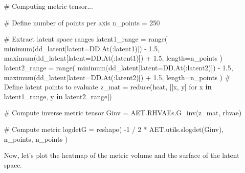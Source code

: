 \documentclass[
]{scrartcl}
\newenvironment{Shaded}{\begin{snugshade}}{\end{snugshade}}
\newcommand{\CommentTok}[1]{\textcolor[rgb]{0.37,0.37,0.37}{#1}}
\newcommand{\FloatTok}[1]{\textcolor[rgb]{0.68,0.00,0.00}{#1}}
\newcommand{\FunctionTok}[1]{\textcolor[rgb]{0.28,0.35,0.67}{#1}}
\newcommand{\KeywordTok}[1]{\textcolor[rgb]{0.00,0.23,0.31}{\textbf{#1}}}
\newcommand{\NormalTok}[1]{\textcolor[rgb]{0.00,0.23,0.31}{#1}}
\newcommand{\OperatorTok}[1]{\textcolor[rgb]{0.37,0.37,0.37}{#1}}
\begin{document}
\begin{Shaded}
\begin{Highlighting}[]
\CommentTok{\# Computing metric tensor...}

\CommentTok{\# Define number of points per axis}
\NormalTok{n\_points }\OperatorTok{=} \FloatTok{250}

\CommentTok{\# Extract latent space ranges}
\NormalTok{latent1\_range }\OperatorTok{=} \FunctionTok{range}\NormalTok{(}
    \FunctionTok{minimum}\NormalTok{(dd\_latent[latent}\OperatorTok{=}\NormalTok{DD.}\FunctionTok{At}\NormalTok{(}\OperatorTok{:}\NormalTok{latent1)]) }\OperatorTok{{-}} \FloatTok{1.5}\NormalTok{,}
    \FunctionTok{maximum}\NormalTok{(dd\_latent[latent}\OperatorTok{=}\NormalTok{DD.}\FunctionTok{At}\NormalTok{(}\OperatorTok{:}\NormalTok{latent1)]) }\OperatorTok{+} \FloatTok{1.5}\NormalTok{,}
\NormalTok{    length}\OperatorTok{=}\NormalTok{n\_points}
\NormalTok{)}
\NormalTok{latent2\_range }\OperatorTok{=} \FunctionTok{range}\NormalTok{(}
    \FunctionTok{minimum}\NormalTok{(dd\_latent[latent}\OperatorTok{=}\NormalTok{DD.}\FunctionTok{At}\NormalTok{(}\OperatorTok{:}\NormalTok{latent2)]) }\OperatorTok{{-}} \FloatTok{1.5}\NormalTok{,}
    \FunctionTok{maximum}\NormalTok{(dd\_latent[latent}\OperatorTok{=}\NormalTok{DD.}\FunctionTok{At}\NormalTok{(}\OperatorTok{:}\NormalTok{latent2)]) }\OperatorTok{+} \FloatTok{1.5}\NormalTok{,}
\NormalTok{    length}\OperatorTok{=}\NormalTok{n\_points}
\NormalTok{)}
\CommentTok{\# Define latent points to evaluate}
\NormalTok{z\_mat }\OperatorTok{=} \FunctionTok{reduce}\NormalTok{(hcat, [[x, y] for x }\KeywordTok{in}\NormalTok{ latent1\_range, y }\KeywordTok{in}\NormalTok{ latent2\_range])}

\CommentTok{\# Compute inverse metric tensor}
\NormalTok{Ginv }\OperatorTok{=}\NormalTok{ AET.RHVAEs.}\FunctionTok{G\_inv}\NormalTok{(z\_mat, rhvae)}

\CommentTok{\# Compute metric }
\NormalTok{logdetG }\OperatorTok{=} \FunctionTok{reshape}\NormalTok{(}
    \OperatorTok{{-}}\FloatTok{1} \OperatorTok{/} \FloatTok{2} \OperatorTok{*}\NormalTok{ AET.utils.}\FunctionTok{slogdet}\NormalTok{(Ginv), n\_points, n\_points}
\NormalTok{)}
\end{Highlighting}
\end{Shaded}

Now, let's plot the heatmap of the metric volume and the surface of the
latent space.
\end{document}
